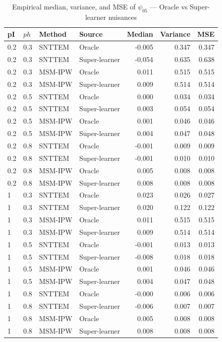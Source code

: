 \documentclass{article}
\begin{document}
\begin{table}[ht]
\centering
\caption{Empirical median, variance, and MSE of $\psi_{05}$ --- Oracle vs Super-learner nuisances}
\begin{tabular}{ll l l r r r}
\toprule
pI & $ph$ & Method & Source & Median & Variance & MSE \\
\midrule
0.2 & 0.3 & SNTTEM & Oracle & -0.005 & 0.347 & 0.347 \\
0.2 & 0.3 & SNTTEM & Super-learner & -0.054 & 0.635 & 0.638 \\
0.2 & 0.3 & MSM-IPW & Oracle & 0.011 & 0.515 & 0.515 \\
0.2 & 0.3 & MSM-IPW & Super-learner & 0.009 & 0.514 & 0.514 \\
0.2 & 0.5 & SNTTEM & Oracle & 0.000 & 0.034 & 0.034 \\
0.2 & 0.5 & SNTTEM & Super-learner & 0.003 & 0.054 & 0.054 \\
0.2 & 0.5 & MSM-IPW & Oracle & 0.001 & 0.046 & 0.046 \\
0.2 & 0.5 & MSM-IPW & Super-learner & 0.004 & 0.047 & 0.048 \\
0.2 & 0.8 & SNTTEM & Oracle & -0.001 & 0.009 & 0.009 \\
0.2 & 0.8 & SNTTEM & Super-learner & -0.001 & 0.010 & 0.010 \\
0.2 & 0.8 & MSM-IPW & Oracle & 0.005 & 0.008 & 0.008 \\
0.2 & 0.8 & MSM-IPW & Super-learner & 0.008 & 0.008 & 0.008 \\
1 & 0.3 & SNTTEM & Oracle & 0.023 & 0.026 & 0.027 \\
1 & 0.3 & SNTTEM & Super-learner & 0.020 & 0.122 & 0.122 \\
1 & 0.3 & MSM-IPW & Oracle & 0.011 & 0.515 & 0.515 \\
1 & 0.3 & MSM-IPW & Super-learner & 0.009 & 0.514 & 0.514 \\
1 & 0.5 & SNTTEM & Oracle & -0.001 & 0.013 & 0.013 \\
1 & 0.5 & SNTTEM & Super-learner & -0.008 & 0.018 & 0.018 \\
1 & 0.5 & MSM-IPW & Oracle & 0.001 & 0.046 & 0.046 \\
1 & 0.5 & MSM-IPW & Super-learner & 0.004 & 0.047 & 0.048 \\
1 & 0.8 & SNTTEM & Oracle & -0.000 & 0.006 & 0.006 \\
1 & 0.8 & SNTTEM & Super-learner & -0.006 & 0.007 & 0.007 \\
1 & 0.8 & MSM-IPW & Oracle & 0.005 & 0.008 & 0.008 \\
1 & 0.8 & MSM-IPW & Super-learner & 0.008 & 0.008 & 0.008 \\
\bottomrule
\end{tabular}
\end{table}
\end{document}
